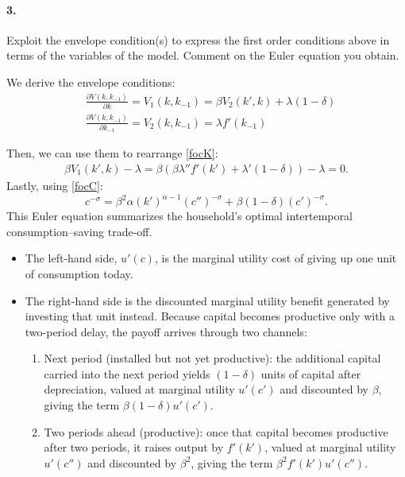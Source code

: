 \documentclass[dvipsnames,11pt]{article}
\begin{document}
\paragraph{3.} Exploit the envelope condition(s) to express the first order conditions above in terms of the variables of the model. Comment on the Euler equation you obtain.  
\begin{solution}
    We derive the envelope conditions:
    \begin{align*}
        & \frac{\partial V(k,k_{-1})}{\partial k}=V_1(k,k_{-1})=\beta V_2(k',k)+\lambda(1-\delta) \\
        & \frac{\partial V(k,k_{-1})}{\partial k_{-1}}=V_2(k,k_{-1})=\lambda f'(k_{-1})
    \end{align*}

Then, we can use them to rearrange \eqref{focK}:
\begin{align*}
    \beta V_1(k',k)-\lambda = \beta(\beta \lambda''f'(k')+\lambda'(1-\delta))-\lambda =0.
\end{align*}
Lastly, using \eqref{focC}:
\[
c^{-\sigma}=\beta^2 \alpha (k')^{\alpha-1}(c'')^{-\sigma}+\beta (1-\delta)(c')^{-\sigma}.
\]
This Euler equation summarizes the household’s optimal intertemporal consumption--saving trade-off. 

\begin{itemize}
    \item The left-hand side, $u'(c)$, is the marginal utility cost of giving up one unit of consumption today.
    
    \item The right-hand side is the discounted marginal utility benefit generated by investing that unit instead. Because capital becomes productive only with a two-period delay, the payoff arrives through two channels:
    \begin{enumerate}
        \item Next period (installed but not yet productive): the additional capital carried into the next period yields $(1-\delta)$ units of capital after depreciation, valued at marginal utility $u'(c')$ and discounted by $\beta$, giving the term $\beta(1-\delta)u'(c')$.
        
        \item Two periods ahead (productive): once that capital becomes productive after two periods, it raises output by $f'(k')$, valued at marginal utility $u'(c'')$ and discounted by $\beta^2$, giving the term $\beta^2 f'(k')u'(c'')$.
    \end{enumerate}
\end{itemize}
\end{solution}
\end{document}
